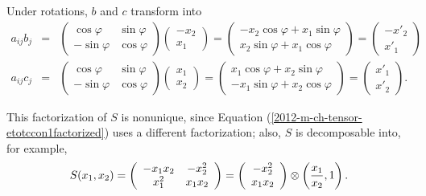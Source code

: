 {Under rotations, $b$ and $c$  transform into
\begin{eqnarray*}
a_{ij}b_j&=&
  \left(
    \begin{array}{cc}
      \cos \varphi  & \sin \varphi \\
      -\sin \varphi & \cos \varphi
    \end{array}
  \right)
  \left(
    \begin{array}{c}
      -x_2\\
       x_1
    \end{array}
  \right)
=
  \left(
    \begin{array}{c}
      -x_2\cos \varphi +x_1 \sin \varphi \\
      x_2\sin \varphi +x_1 \cos \varphi
    \end{array}
  \right)
=
  \left(
    \begin{array}{c}
      -x'_2 \\
      x'_1
    \end{array}
  \right)    \\
 a_{ij}c_j&=&
  \left(
    \begin{array}{cc}
      \cos \varphi  & \sin \varphi \\
      -\sin \varphi & \cos \varphi
    \end{array}
  \right)
  \left(
    \begin{array}{c}
      x_1\\
       x_2
    \end{array}
  \right)
=
  \left(
    \begin{array}{c}
      x_1\cos \varphi +x_2 \sin \varphi \\
      -x_1\sin \varphi +x_2 \cos \varphi
    \end{array}
  \right)
=
  \left(
    \begin{array}{c}
      x'_1    \\
      x'_2
    \end{array}
  \right) .
\end{eqnarray*}

This factorization of $S$ is nonunique, since
Equation
(\ref{2012-m-ch-tensor-etotccon1factorized})
uses a different factorization; also, $S$ is decomposable into, for example,
$$S(x_1,x_2)=
  \left(
    \begin{array}{cc}
      -x_1x_2 & -x_2^2 \\
      x_1^2   & x_1x_2
    \end{array}
  \right)     =
  \left(
    \begin{array}{cc}
      -x_2^2 \\
      x_1 x_2
    \end{array}
  \right)
\otimes \left({x_1\over x_2},1\right).
$$



\eexample
}



